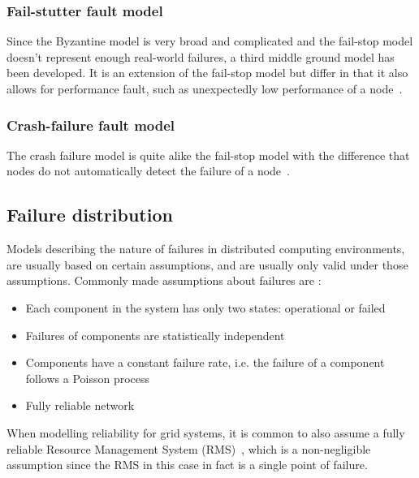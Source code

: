 \documentclass{cslthse-msc}
\begin{document}
\subsubsection{Fail-stutter fault model}
Since the Byzantine model is very broad and complicated and the fail-stop model doesn't represent enough real-world failures, a third middle ground model has been developed. It is an extension of the fail-stop model but differ in that it also allows for performance fault, such as unexpectedly low performance of a node~\cite{surveyFaultParallel}.

\subsubsection{Crash-failure fault model}
The crash failure model is quite alike the fail-stop model with the difference that nodes do not automatically detect the failure of a node~\cite{faultTolerantFundamentals, adaptiveAgentReplication}.

\subsection{Failure distribution} \label{subsec:background_failure_distribution}
Models describing the nature of failures in distributed computing environments, are usually based on certain assumptions, and are usually only valid under those assumptions. Commonly made assumptions about failures are \cite{relModelDistSimSystem, relModelAnalysis, cloudServiceRel, studyServiceRel, hierarchicalRelModeling, selfAdaptRel}:
\begin{itemize}
	\item Each component in the system has only two states: operational or failed
	\item Failures of components are statistically independent
	\item Components have a constant failure rate, i.e. the failure of a component follows a Poisson process
	\item Fully reliable network
\end{itemize}

When modelling reliability for grid systems, it is common to also assume a fully reliable Resource Management System (RMS)~\cite{relAndPerfGridServices, relGridServicePredConstraint}, which is a non-negligible assumption since the RMS in this case in fact is a single point of failure.
\end{document}
